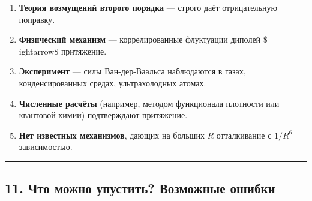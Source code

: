 \documentclass[11pt]{article}
\providecommand{\tightlist}{%
      \setlength{\itemsep}{0pt}\setlength{\parskip}{0pt}}
\begin{document}
\begin{enumerate}
\def\labelenumi{\arabic{enumi}.}
\tightlist
\item
  \textbf{Теория возмущений второго порядка} --- строго даёт
  отрицательную поправку.
\item
  \textbf{Физический механизм} --- коррелированные флуктуации диполей \$
  ightarrow\$ притяжение.
\item
  \textbf{Эксперимент} --- силы Ван-дер-Ваальса наблюдаются в газах,
  конденсированных средах, ультрахолодных атомах.
\item
  \textbf{Численные расчёты} (например, методом функционала плотности
  или квантовой химии) подтверждают притяжение.
\item
  \textbf{Нет известных механизмов}, дающих на больших \(R\)
  отталкивание с \(1/R^6\) зависимостью.
\end{enumerate}

\begin{center}\rule{0.5\linewidth}{\linethickness}\end{center}

\subsection{11. Что можно упустить? Возможные
ошибки}\label{ux447ux442ux43e-ux43cux43eux436ux43dux43e-ux443ux43fux443ux441ux442ux438ux442ux44c-ux432ux43eux437ux43cux43eux436ux43dux44bux435-ux43eux448ux438ux431ux43aux438}
\end{document}

